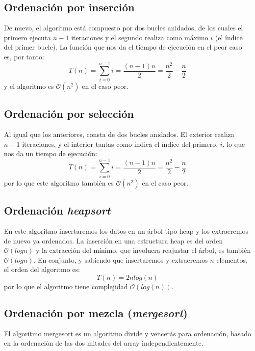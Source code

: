 \documentclass[a4paper, 11pt]{article} %
\begin{document}
\subsection{Ordenación por inserción}
De nuevo, el algoritmo está compuesto por dos bucles anidados, de los cuales el primero ejecuta $n-1$ iteraciones y el segundo realiza como máximo $i$ (el índice del primer bucle). La función que nos da el tiempo de ejecución en el peor caso es, por tanto:
\begin{equation}
 T(n) = \sum_{i=0}^{n-1} i = \frac{(n-1)n}{2} = \frac{n^2}{2} - \frac{n}{2}
\end{equation}
y el algoritmo es $\mathcal{O}(n^2)$ en el caso peor.
\subsection{Ordenación por selección}
Al igual que los anteriores, consta de dos bucles anidados. El exterior realiza $n-1$ iteraciones, y el interior tantas como indica el índice del primero, $i$, lo que nos da un tiempo de ejecución:
\begin{equation}
 T(n) = \sum_{i=0}^{n-1} i = \frac{(n-1)n}{2} = \frac{n^2}{2} - \frac{n}{2}
\end{equation}
por lo que este algoritmo también es $\mathcal{O}(n^2)$ en el caso peor.

\subsection{Ordenación \textit{heapsort}}
En este algoritmo insertaremos los datos en un árbol tipo heap y los extraeremos de nuevo ya ordenados.
La inserción en una estructura heap es del orden $\mathcal{O}(log n)$ y la extracción del mínimo, que involucra
reajustar el árbol, es también $\mathcal{O}(log n)$. En conjunto, y sabiendo que insertaremos y extraeremos $n$ elementos,
el orden del algoritmo es:
\begin{equation}
 T(n) = 2 n log(n)
\end{equation}
por lo que el algoritmo tiene complejidad $\mathcal{O}(log(n))$.


\subsection{Ordenación por mezcla (\textit{mergesort})}
El algoritmo mergesort es un algoritmo divide y vencerás para ordenación, basado en la ordenación de las dos mitades del
array independientemente.
\end{document}
